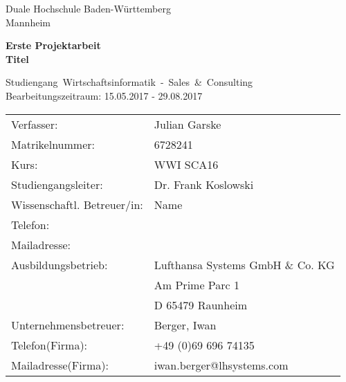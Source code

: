 \documentclass [12pt, a4paper, oneside, titlepage, ngerman]{article}
\begin{document}
\begin{titlepage}
\Large
\begin{minipage}{\textwidth} \centering \Large
     Duale Hochschule Baden-Württemberg \\  
     Mannheim 
\end{minipage} \vspace{1cm}

\begin{minipage}{\textwidth} \centering \Large
     \textbf{Erste Projektarbeit \\ Titel}
\end{minipage} \vspace{1cm}

\begin{minipage}{\textwidth} \centering \Large
     \mbox{Studiengang Wirtschaftsinformatik - Sales \& Consulting}\\  \large Bearbeitungszeitraum: 15.05.2017 - 29.08.2017
\end{minipage} \vspace{1cm}


\begin{table}[h!]
  \begin{tabular}{ll}
Verfasser: & Julian Garske \\
Matrikelnummer: & 6728241 \vspace{0.5cm} \\ 
Kurs: & WWI SCA16 \\
 Studiengangsleiter:& Dr. Frank Koslowski \vspace{0.5cm} \\
Wissenschaftl. Betreuer/in: &Name \\ 
Telefon:& \\ 
Mailadresse:& \vspace{0.5cm}\\
Ausbildungsbetrieb: &Lufthansa Systems GmbH \& Co. KG \\ 
& Am Prime Parc 1 \\ 
& D 65479 Raunheim \vspace{0.5cm}\\
Unternehmensbetreuer: &Berger, Iwan \\ 
Telefon(Firma): &+49 (0)69 696 74135 \\
 Mailadresse(Firma):& iwan.berger@lhsystems.com \\
  \end{tabular}
\end{table}



\end{titlepage}
\end{document}
